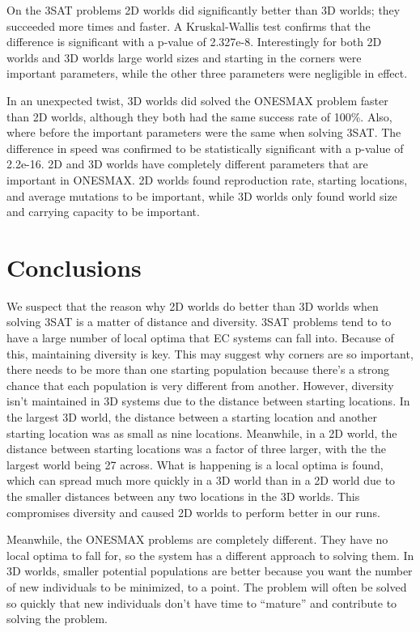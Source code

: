 \documentclass[12pt]{article}
\begin{document}
On the 3SAT problems 2D worlds did significantly better than 3D worlds; they succeeded more times and faster. A Kruskal-Wallis test confirms that the difference is significant with a p-value of 2.327e-8. Interestingly for both 2D worlds and 3D worlds large world sizes and starting in the corners were important parameters, while the other three parameters were negligible in effect. 

In an unexpected twist, 3D worlds did solved the ONESMAX problem faster than 2D worlds, although they both had the same success rate of 100\%. Also, where before the important parameters were the same when solving 3SAT. The difference in speed was confirmed to be statistically significant with a p-value of 2.2e-16. 2D and 3D worlds have completely different parameters that are important in ONESMAX. 2D worlds found reproduction rate, starting locations, and average mutations to be important, while 3D worlds only found world size and carrying capacity to be important.

\section{Conclusions} \label{sec:conclusion}

We suspect that the reason why 2D worlds do better than 3D worlds when solving 3SAT is a matter of distance and diversity. 3SAT problems tend to to have a large number of local optima that EC systems can fall into. Because of this, maintaining diversity is key. This may suggest why corners are so important, there needs to be more than one starting population because there's a strong chance that each population is very different from another. However, diversity isn't maintained in 3D systems due to the distance between starting locations. In the largest 3D world, the distance between a starting location and another starting location was as small as nine locations. Meanwhile, in a 2D world, the distance between starting locations was a factor of three larger, with the the largest world being 27 across. What is happening is a local optima is found, which can spread much more quickly in a 3D world than in a 2D world due to the smaller distances between any two locations in the 3D worlds. This compromises diversity and caused 2D worlds to perform better in our runs.

Meanwhile, the ONESMAX problems are completely different. They have no local optima to fall for, so the system has a different approach to solving them. In 3D worlds, smaller potential populations are better because you want the number of new individuals to be minimized, to a point. The problem will often be solved so quickly that new individuals don't have time to ``mature'' and contribute to solving the problem.
\end{document}
